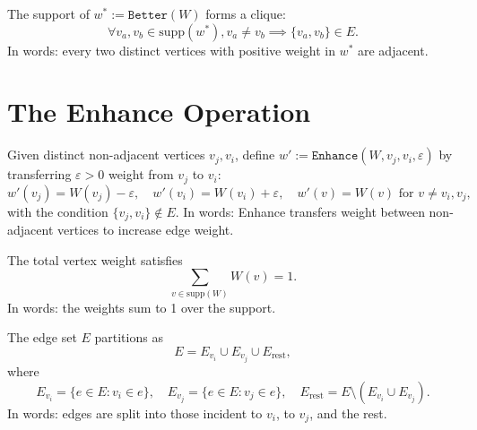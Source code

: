 \begin{theorem}
    \label{thm:Better_forms_clique}
The support of \(w^* := \texttt{Better}(W)\) forms a clique:
\[
\forall v_a, v_b \in \mathrm{supp}(w^*), v_a \neq v_b \implies \{v_a, v_b\} \in E.
\]
In words: every two distinct vertices with positive weight in \(w^*\) are adjacent.
\end{theorem}


\section{The Enhance Operation}

\begin{definition}[Enhance]
  \label{def:Enhance}
  \leanok
Given distinct non-adjacent vertices \(v_j, v_i\), define \(w' := \texttt{Enhance}(W, v_j, v_i, \varepsilon)\) by transferring \(\varepsilon > 0\) weight from \(v_j\) to \(v_i\):
\[
w'(v_j) = W(v_j) - \varepsilon, \quad w'(v_i) = W(v_i) + \varepsilon, \quad w'(v) = W(v) \text{ for } v \neq v_i, v_j,
\]
with the condition \(\{v_j, v_i\} \notin E\).
In words: Enhance transfers weight between non-adjacent vertices to increase edge weight.
\end{definition}

\begin{lemma}
  \label{lem:sum_over_support}
  \leanok
The total vertex weight satisfies
\[
\sum_{v \in \mathrm{supp}(W)} W(v) = 1.
\]
In words: the weights sum to 1 over the support.
\end{lemma}

\begin{lemma}
  \label{lem:supported_edge_partition}
  \leanok
The edge set \(E\) partitions as
\[
E = E_{v_i} \cup E_{v_j} \cup E_{\mathrm{rest}},
\]
where
\[
E_{v_i} = \{e \in E : v_i \in e\}, \quad E_{v_j} = \{e \in E : v_j \in e\}, \quad E_{\mathrm{rest}} = E \setminus (E_{v_i} \cup E_{v_j}).
\]
In words: edges are split into those incident to \(v_i\), to \(v_j\), and the rest.
\end{lemma}

